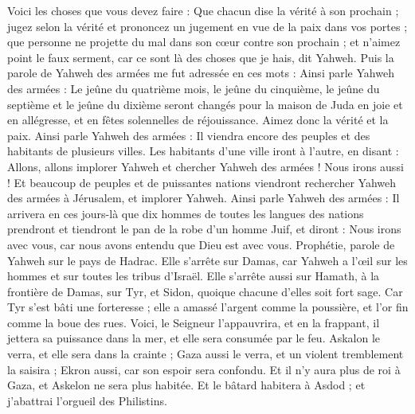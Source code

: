 \begin{multicols}{2}
Voici les choses que vous devez faire : Que chacun dise la vérité à son prochain ; jugez selon la vérité et prononcez un jugement en vue de la paix dans vos portes ;
que personne ne projette du mal dans son cœur contre son prochain ; et n'aimez point le faux serment, car ce sont là des choses que je hais, dit Yahweh.
Puis la parole de Yahweh des armées me fut adressée en ces mots :
Ainsi parle Yahweh des armées : Le jeûne du quatrième mois, le jeûne du cinquième, le jeûne du septième et le jeûne du dixième seront changés pour la maison de Juda en joie et en allégresse, et en fêtes solennelles de réjouissance. Aimez donc la vérité et la paix.
Ainsi parle Yahweh des armées : Il viendra encore des peuples et des habitants de plusieurs villes.
Les habitants d'une ville iront à l'autre, en disant : Allons, allons implorer Yahweh et chercher Yahweh des armées ! Nous irons aussi !
Et beaucoup de peuples et de puissantes nations viendront rechercher Yahweh des armées à Jérusalem, et implorer Yahweh.
Ainsi parle Yahweh des armées : Il arrivera en ces jours-là que dix hommes de toutes les langues des nations prendront et tiendront le pan de la robe d'un homme Juif, et diront : Nous irons avec vous, car nous avons entendu que Dieu est avec vous.
\VerseOne{}Prophétie, parole de Yahweh sur le pays de Hadrac. Elle s'arrête sur Damas, car Yahweh a l'œil sur les hommes et sur toutes les tribus d'Israël.
Elle s'arrête aussi sur Hamath, à la frontière de Damas, sur Tyr, et Sidon, quoique chacune d'elles soit fort sage.
Car Tyr s'est bâti une forteresse ; elle a amassé l'argent comme la poussière, et l'or fin comme la boue des rues.
Voici, le Seigneur l'appauvrira, et en la frappant, il jettera sa puissance dans la mer, et elle sera consumée par le feu.
Askalon le verra, et elle sera dans la crainte ; Gaza aussi le verra, et un violent tremblement la saisira ; Ekron aussi, car son espoir sera confondu. Et il n'y aura plus de roi à Gaza, et Askelon ne sera plus habitée.
Et le bâtard habitera à Asdod ; et j'abattrai l'orgueil des Philistins.

\end{multicols}
